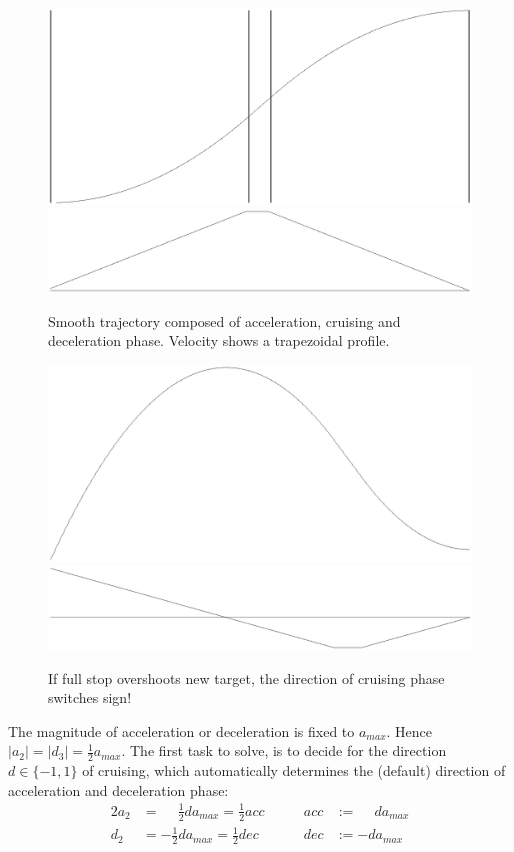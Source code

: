 \documentclass[11pt,english]{article}
\newcommand{\am}{a_{max}}
\newcommand{\half}{\frac{1}{2}}
\begin{document}
\begin{figure}
  \begin{minipage}[t]{0.45\linewidth}
    \includegraphics[width=\linewidth]{simple-x.eps}
    \includegraphics[width=\linewidth]{simple-v.eps}
    \caption{Smooth trajectory composed of acceleration, cruising and
      deceleration phase. Velocity shows a trapezoidal profile.}
    \label{fig:simple}
  \end{minipage}\hfill
  \begin{minipage}[t]{0.45\linewidth}
    \includegraphics[width=\linewidth]{overshoot-x.eps}
    \includegraphics[width=\linewidth]{overshoot-v.eps}
    \caption{If full stop overshoots new target, the direction of cruising
      phase switches sign!}
    \label{fig:overshoot}
  \end{minipage}
\end{figure}
The magnitude of acceleration or deceleration is fixed to $\am$. Hence $|a_2|
= |d_3| = \half \am$. The first task to solve, is to decide for the direction
$d \in \{-1,1\}$ of cruising, which automatically determines the (default)
direction of acceleration and deceleration phase:
\begin{alignat*}{2} 
  a_2 &= \phantom{-}\half d \am = \half acc &\qquad acc &:= \phantom{-}d \am \\
  d_2 &= -\half d \am = \half dec &\qquad dec &:= -d \am
\end{alignat*}
\end{document}
